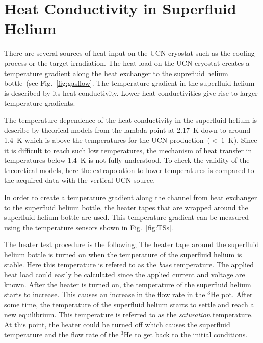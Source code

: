 \chapter{Heat Conductivity in Superfluid
  Helium~\label{sec:heattest}~\cite{Florian_thesis}}


There are several sources of heat input on the UCN cryostat such as
the cooling process or the target irradiation. The heat load on the
UCN cryostat creates a temperature gradient along the heat exchanger
to the suprefluid helium bottle~(see Fig.~\ref{fig:gasflow}. The
temperature gradient in the superfluid helium is described by its heat
conductivity. Lower heat conductivities give rise to larger
temperature gradients.

The temperature dependence of the heat conductivity in the superfluid
helium is describe by theorical models from the lambda point at 2.17~K
down to around 1.4~K which is above the temperatures for the UCN
production~($<~1$~K). Since it is difficult to reach such low
temperatures, the mechanism of heat transfer in temperatures below
1.4~K is not fully understood.  To check the validity of the
theoretical models, here the extrapolation to lower temperatures is
compared to the acquired data with the vertical UCN source.


In order to create a temperature gradient along the channel from heat
exchanger to the superfluid helium bottle, the heater tapes that are
wrapped around the superfluid helium bottle are used.
This temperature gradient can be measured using the temperature
sensors shown in Fig.~\ref{fig:TSs}.

The heater test procedure is the following; The heater tape around the
superfluid helium bottle is turned on when the temperature of the
superfluid helium is stable. Here this temperature is refered to as
the {\it{base}} temperature. The applied heat load could easily be
calculated since the applied current and voltage are known. After the
heater is turned on, the temperature of the superfluid helium starts
to increase. This causes an increase in the flow rate in the $^3$He
pot. After some time, the temperature of the superfluid helium starts
to settle and reach a new equilibrium. This temperature is referred to
as the {\it{saturation}} temperature. At this point, the heater could
be turned off which causes the superfluid temperature and the flow
rate of the $^3$He to get back to the initial conditions.


